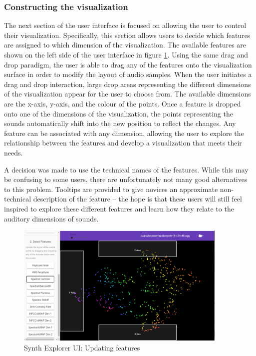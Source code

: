 \subsubsection{Constructing the visualization}
The next section of the user interface is focused on allowing the user to control their visualization. Specifically, this section allows users to decide which features are assigned to which dimension of the visualization. The available features are shown on the left side of the user interface in figure \ref{fig:features}. Using the same drag and drop paradigm, the user is able to drag any of the features onto the visualization surface in order to modify the layout of audio samples. When the user initiates a drag and drop interaction, large drop areas representing the different dimensions of the visualization appear for the user to choose from. The available dimensions are the x-axis, y-axis, and the colour of the points. Once a feature is dropped onto one of the dimensions of the visualization, the points representing the sounds automatically shift into the new position to reflect the changes. Any feature can be associated with any dimension, allowing the user to explore the relationship between the features and develop a visualization that meets their needs.

A decision was made to use the technical names of the features. While this may be confusing to some users, there are unfortunately not many good alternatives to this problem. Tooltips are provided to give novices an approximate non-technical description of the feature -- the hope is that these users will still feel inspired to explore these different features and learn how they relate to the auditory dimensions of sounds.

\begin{figure}
    \centering
    \includegraphics[width=0.9\textwidth]{SynthExplore A.png}
    \caption{Synth Explorer UI: Updating features}
    \label{fig:features}
\end{figure}


